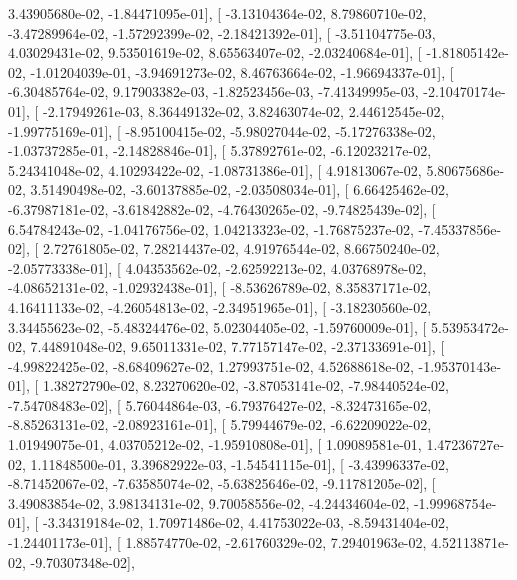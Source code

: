 \documentclass{article}
\begin{document}
          3.43905680e-02,  -1.84471095e-01],
       [ -3.13104364e-02,   8.79860710e-02,  -3.47289964e-02,
         -1.57292399e-02,  -2.18421392e-01],
       [ -3.51104775e-03,   4.03029431e-02,   9.53501619e-02,
          8.65563407e-02,  -2.03240684e-01],
       [ -1.81805142e-02,  -1.01204039e-01,  -3.94691273e-02,
          8.46763664e-02,  -1.96694337e-01],
       [ -6.30485764e-02,   9.17903382e-03,  -1.82523456e-03,
         -7.41349995e-03,  -2.10470174e-01],
       [ -2.17949261e-03,   8.36449132e-02,   3.82463074e-02,
          2.44612545e-02,  -1.99775169e-01],
       [ -8.95100415e-02,  -5.98027044e-02,  -5.17276338e-02,
         -1.03737285e-01,  -2.14828846e-01],
       [  5.37892761e-02,  -6.12023217e-02,   5.24341048e-02,
          4.10293422e-02,  -1.08731386e-01],
       [  4.91813067e-02,   5.80675686e-02,   3.51490498e-02,
         -3.60137885e-02,  -2.03508034e-01],
       [  6.66425462e-02,  -6.37987181e-02,  -3.61842882e-02,
         -4.76430265e-02,  -9.74825439e-02],
       [  6.54784243e-02,  -1.04176756e-02,   1.04213323e-02,
         -1.76875237e-02,  -7.45337856e-02],
       [  2.72761805e-02,   7.28214437e-02,   4.91976544e-02,
          8.66750240e-02,  -2.05773338e-01],
       [  4.04353562e-02,  -2.62592213e-02,   4.03768978e-02,
         -4.08652131e-02,  -1.02932438e-01],
       [ -8.53626789e-02,   8.35837171e-02,   4.16411133e-02,
         -4.26054813e-02,  -2.34951965e-01],
       [ -3.18230560e-02,   3.34455623e-02,  -5.48324476e-02,
          5.02304405e-02,  -1.59760009e-01],
       [  5.53953472e-02,   7.44891048e-02,   9.65011331e-02,
          7.77157147e-02,  -2.37133691e-01],
       [ -4.99822425e-02,  -8.68409627e-02,   1.27993751e-02,
          4.52688618e-02,  -1.95370143e-01],
       [  1.38272790e-02,   8.23270620e-02,  -3.87053141e-02,
         -7.98440524e-02,  -7.54708483e-02],
       [  5.76044864e-03,  -6.79376427e-02,  -8.32473165e-02,
         -8.85263131e-02,  -2.08923161e-01],
       [  5.79944679e-02,  -6.62209022e-02,   1.01949075e-01,
          4.03705212e-02,  -1.95910808e-01],
       [  1.09089581e-01,   1.47236727e-02,   1.11848500e-01,
          3.39682922e-03,  -1.54541115e-01],
       [ -3.43996337e-02,  -8.71452067e-02,  -7.63585074e-02,
         -5.63825646e-02,  -9.11781205e-02],
       [  3.49083854e-02,   3.98134131e-02,   9.70058556e-02,
         -4.24434604e-02,  -1.99968754e-01],
       [ -3.34319184e-02,   1.70971486e-02,   4.41753022e-03,
         -8.59431404e-02,  -1.24401173e-01],
       [  1.88574770e-02,  -2.61760329e-02,   7.29401963e-02,
          4.52113871e-02,  -9.70307348e-02],
\end{document}
